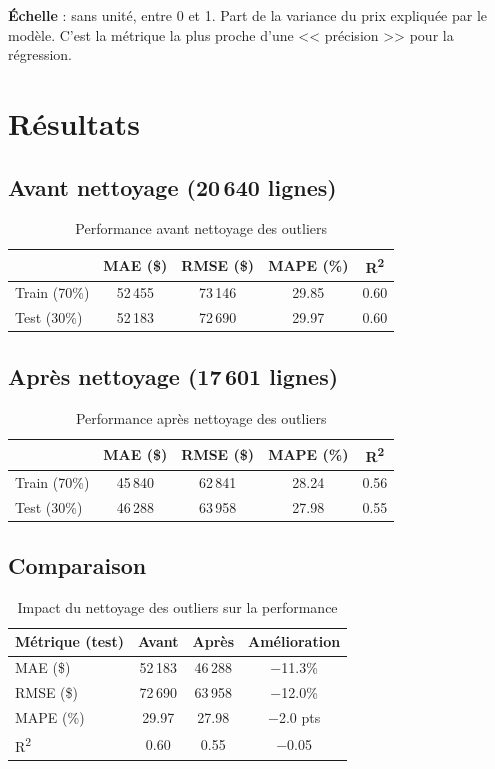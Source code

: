 \documentclass[a4paper,11pt]{article}
\begin{document}
\textbf{\'Echelle} : sans unit\'e, entre 0 et 1. Part de la variance du prix expliqu\'ee par le mod\`ele. C'est la m\'etrique la plus proche d'une << pr\'ecision >> pour la r\'egression.

\section{R\'esultats}

\subsection{Avant nettoyage (20\,640 lignes)}

\begin{table}[h]
\centering
\begin{tabular}{lcccc}
\toprule
& \textbf{MAE (\$)} & \textbf{RMSE (\$)} & \textbf{MAPE (\%)} & \textbf{R\textsuperscript{2}} \\
\midrule
Train (70\%) & 52\,455 & 73\,146 & 29.85 & 0.60 \\
Test (30\%)  & 52\,183 & 72\,690 & 29.97 & 0.60 \\
\bottomrule
\end{tabular}
\caption{Performance avant nettoyage des outliers}
\end{table}

\subsection{Apr\`es nettoyage (17\,601 lignes)}

\begin{table}[h]
\centering
\begin{tabular}{lcccc}
\toprule
& \textbf{MAE (\$)} & \textbf{RMSE (\$)} & \textbf{MAPE (\%)} & \textbf{R\textsuperscript{2}} \\
\midrule
Train (70\%) & 45\,840 & 62\,841 & 28.24 & 0.56 \\
Test (30\%)  & 46\,288 & 63\,958 & 27.98 & 0.55 \\
\bottomrule
\end{tabular}
\caption{Performance apr\`es nettoyage des outliers}
\end{table}

\subsection{Comparaison}

\begin{table}[h]
\centering
\begin{tabular}{lccc}
\toprule
\textbf{M\'etrique (test)} & \textbf{Avant} & \textbf{Apr\`es} & \textbf{Am\'elioration} \\
\midrule
MAE (\$)  & 52\,183 & 46\,288 & $-$11.3\% \\
RMSE (\$) & 72\,690 & 63\,958 & $-$12.0\% \\
MAPE (\%) & 29.97   & 27.98   & $-$2.0 pts \\
R\textsuperscript{2} & 0.60 & 0.55 & $-$0.05 \\
\bottomrule
\end{tabular}
\caption{Impact du nettoyage des outliers sur la performance}
\end{table}
\end{document}

